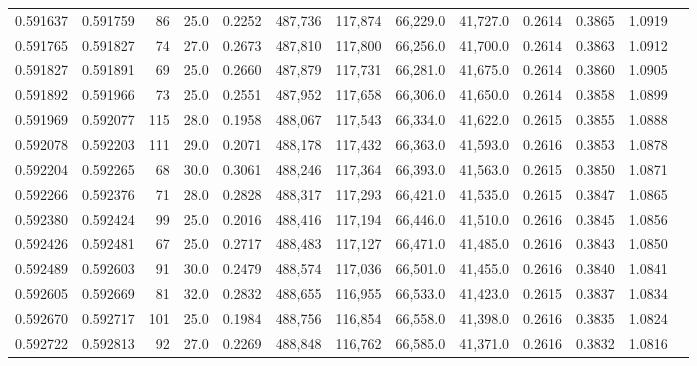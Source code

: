 \begin{tabular}{rrrrrrrrrrrrr}
0.591637 & 0.591759 &    86 & 25.0 &                                     0.2252 & 487,736 & 117,874 &  66,229.0 &  41,727.0 & 0.2614 & 0.3865 & 1.0919 \\
0.591765 & 0.591827 &    74 & 27.0 &                                     0.2673 & 487,810 & 117,800 &  66,256.0 &  41,700.0 & 0.2614 & 0.3863 & 1.0912 \\
0.591827 & 0.591891 &    69 & 25.0 &                                     0.2660 & 487,879 & 117,731 &  66,281.0 &  41,675.0 & 0.2614 & 0.3860 & 1.0905 \\
0.591892 & 0.591966 &    73 & 25.0 &                                     0.2551 & 487,952 & 117,658 &  66,306.0 &  41,650.0 & 0.2614 & 0.3858 & 1.0899 \\
0.591969 & 0.592077 &   115 & 28.0 &                                     0.1958 & 488,067 & 117,543 &  66,334.0 &  41,622.0 & 0.2615 & 0.3855 & 1.0888 \\
0.592078 & 0.592203 &   111 & 29.0 &                                     0.2071 & 488,178 & 117,432 &  66,363.0 &  41,593.0 & 0.2616 & 0.3853 & 1.0878 \\
0.592204 & 0.592265 &    68 & 30.0 &                                     0.3061 & 488,246 & 117,364 &  66,393.0 &  41,563.0 & 0.2615 & 0.3850 & 1.0871 \\
0.592266 & 0.592376 &    71 & 28.0 &                                     0.2828 & 488,317 & 117,293 &  66,421.0 &  41,535.0 & 0.2615 & 0.3847 & 1.0865 \\
0.592380 & 0.592424 &    99 & 25.0 &                                     0.2016 & 488,416 & 117,194 &  66,446.0 &  41,510.0 & 0.2616 & 0.3845 & 1.0856 \\
0.592426 & 0.592481 &    67 & 25.0 &                                     0.2717 & 488,483 & 117,127 &  66,471.0 &  41,485.0 & 0.2616 & 0.3843 & 1.0850 \\
0.592489 & 0.592603 &    91 & 30.0 &                                     0.2479 & 488,574 & 117,036 &  66,501.0 &  41,455.0 & 0.2616 & 0.3840 & 1.0841 \\
0.592605 & 0.592669 &    81 & 32.0 &                                     0.2832 & 488,655 & 116,955 &  66,533.0 &  41,423.0 & 0.2615 & 0.3837 & 1.0834 \\
0.592670 & 0.592717 &   101 & 25.0 &                                     0.1984 & 488,756 & 116,854 &  66,558.0 &  41,398.0 & 0.2616 & 0.3835 & 1.0824 \\
0.592722 & 0.592813 &    92 & 27.0 &                                     0.2269 & 488,848 & 116,762 &  66,585.0 &  41,371.0 & 0.2616 & 0.3832 & 1.0816 \\

\end{tabular}
